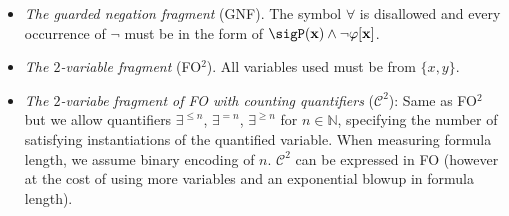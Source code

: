 \documentclass[10pt,a4paper]{amsart}
\theoremstyle{definition}
\numberwithin{equation}{section}
\theoremstyle{plain}
\theoremstyle{definition}
\theoremstyle{myexample}
\theoremstyle{plain}
\theoremstyle{definition}
\begin{document}
\begin{itemize}
	\item
	\emph{The guarded negation fragment} (GNF). The symbol $\forall$ is disallowed 
	and every occurrence of $\neg$ must be in the form of
	$\sigP(\bold{x}) \wedge \neg \varphi[\bold{x}]$.
	\item
	\emph{The $2$-variable fragment} (FO$^2$). All variables used must be from $\{x,y\}$.
	\item
	\emph{The $2$-variabe fragment of FO with counting quantifiers} ($\mathcal{C}^2$): Same as FO$^2$ but we allow quantifiers $\exists^{\leq n}$, $\exists^{= n}$, $\exists^{\geq n}$ for $n\in \mathbb{N}$, specifying the number of satisfying instantiations of the quantified variable. When measuring formula length, we assume binary encoding of $n$. $\mathcal{C}^2$ can be expressed in FO (however at the cost of using more variables and an exponential blowup in formula length).
\end{itemize}
\end{document}
